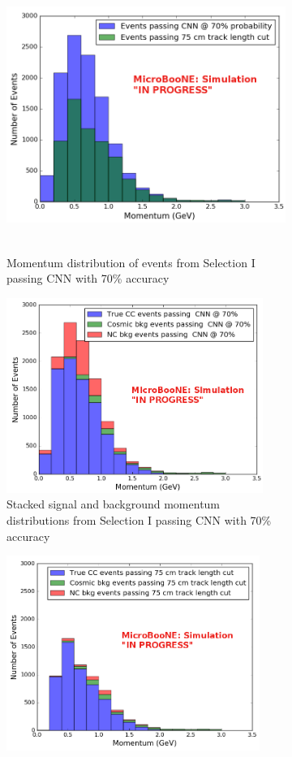\begin{figure}[htp!]
\centering
	\begin{subfigure}[t]{.9\textwidth}
	\centering
	\includegraphics[width=\textwidth,height=3.5in]{figs/sel1mod_parP_wrongnorm_acc70_0706.png}
	\caption{Momentum distribution of events from Selection I passing CNN with 70\% accuracy}
	\label{fig:sel1mod_momentum}
	\end{subfigure}
	\quad
	\begin{subfigure}[t]{.45\textwidth}
	\includegraphics[width=\textwidth,height=2.5in]{figs/sel1mod_cnn_parP_stackedevents_0707.png}
	\caption{Stacked signal and background momentum distributions from Selection I passing CNN with 70\% accuracy}
	\label{fig:sel1mod_momentum_stackedcnn}
	\end{subfigure}
	\quad
	\begin{subfigure}[t]{.45\textwidth}
	\includegraphics[width=\textwidth,height=2.5in]{figs/sel1mod_original_parP_stackedevents_0707.png}

\end{subfigure}
\end{figure}
